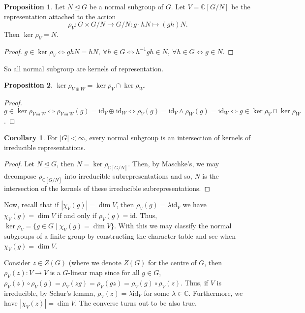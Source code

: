 \documentclass[]{article}
\theoremstyle{definition}
\newtheorem{corollary}{Corollary}[theorem]
\theoremstyle{definition}
\newtheorem{proposition}{Proposition}[section]
\begin{document}
\begin{proposition}
  Let \(N \trianglelefteq G\) be a normal subgroup of \(G\). Let 
  \(V = \mathbb{C}[G / N]\) be the representation attached to the action 
  \[\rho_V : G \times G / N \to G / N : g \cdot hN \mapsto (gh) N.\]
  Then \(\ker \rho_V = N\).
\end{proposition}
\begin{proof}
  \(g \in \ker \rho_V \iff ghN = hN, \ \forall h \in G \iff 
    h^{-1}gh \in N, \ \forall h \in G \iff g \in N\).
\end{proof}

So all normal subgroup are kernels of representation. 

\begin{proposition}
  \(\ker \rho_{V \oplus W} =  \ker \rho_V \cap \ker \rho_W\).
\end{proposition}
\begin{proof}
  \(g \in \ker \rho_{V \oplus W} \iff \rho_{V \oplus W}(g) = \text{id}_V \oplus 
  \text{id}_W \iff \rho_V(g) = \text{id}_V \wedge \rho_W(g) = \text{id}_W 
  \iff g \in \ker \rho_V \cap \ker \rho_W\).
\end{proof}

\begin{corollary}
  For \(|G| < \infty\), every normal subgroup is an intersection of kernels of 
  irreducible representations.
\end{corollary}
\begin{proof}
  Let \(N \trianglelefteq G\), then \(N = \ker \rho_{\mathbb{C}[G / N]}\). 
  Then, by Maschke's, we may decompose \(\rho_{\mathbb{C}[G / N]}\) into 
  irreducible subrepresentations and so, \(N\) is the intersection of the 
  kernels of these irreducible subrepresentations.
\end{proof}

Now, recall that if \(|\chi_V(g)| = \dim V\), then 
\(\rho_V(g) = \lambda \text{id}_V\) we have \(\chi_V(g) = \dim V\) 
if and only if \(\rho_V(g) = \text{id}\). Thus,
\(\ker \rho_V = \{g \in G \mid \chi_V(g) = \dim V\}\).
With this we may classify the normal subgroups of a finite group by 
constructing the character table and see when \(\chi_V(g) = \dim V\).

Consider \(z \in Z(G)\) (where we denote \(Z(G)\) for the centre of 
\(G\), then \(\rho_V(z) : V \to V\) is a \(G\)-linear map since 
for all \(g \in G\), \(\rho_V(z) \circ \rho_V(g) = \rho_V(zg) = \rho_V(gz) = 
\rho_V(g) \circ \rho_V(z)\). Thus, if \(V\) is irreducible, by Schur's lemma, 
\(\rho_V(z) = \lambda\text{id}_V\) for some \(\lambda \in \mathbb{C}\).
Furthermore, we have \(|\chi_V(z)| = \dim V\). The converse turns out to be 
also true.
\end{document}
